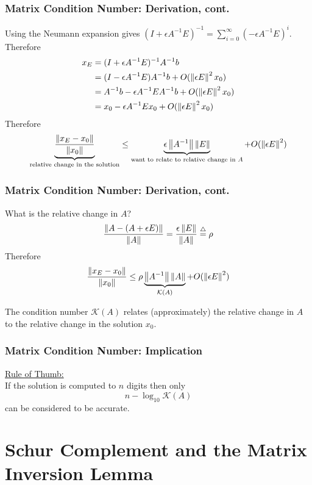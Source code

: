 \documentclass{beamer}
\begin{document}
\begin{frame}\frametitle{Matrix Condition Number: Derivation, cont.}
	Using the Neumann expansion gives
	$(I+\epsilon A^{-1}E)^{-1} = \displaystyle \sum_{i=0}^{\infty} (-\epsilon A^{-1} E)^i$.  Therefore
	\begin{align*}
		x_E &= (I+\epsilon A^{-1}E)^{-1}A^{-1}b \\ 
		&=(I - \epsilon A^{-1} E)A^{-1}b + O(\left\|\epsilon E \right\|^2x_0)\\
		&= A^{-1}b - \epsilon A^{-1}EA^{-1}b + O(\left\|\epsilon E \right\|^2x_0)\\
		&= x_0 - \epsilon A^{-1}Ex_0 + O(\left\|\epsilon E \right\|^2x_0)
	\end{align*}
	Therefore
	\[\underbrace{\displaystyle\frac{\left\|x_E-x_0 \right\|}{\left\|x_0 \right\|}}_{\text{relative change in the solution}} \leq \underbrace{\epsilon\left\|A^{-1} \right\|\left\|E \right\|}_{\text{want to relate to relative change in $A$}}+O(\left\|\epsilon E \right\|^2)  \]
\end{frame}

\begin{frame}\frametitle{Matrix Condition Number: Derivation, cont.}
	What is the relative change in $A$?
	\[\frac{  \left\|A - (A + \epsilon E) \right\|}{  \left\|A \right\|} = \frac{  \epsilon\left\|E \right\|}{  \left\|A \right\|} \stackrel{\triangle}{=} \rho\]
	Therefore
	\[
		\frac{ \left\|x_E - x_0 \right\|}{\left\|x_0 \right\|} \leq \rho \underbrace{\left\|A^{-1}\right\|\left\|A \right\| }_{\mathcal{K}(A)} + O(\left\|\epsilon E \right\|^2) 
	\]
	
	The condition number $\mathcal{K}(A)$ relates (approximately) the relative change in $A$ to the relative change in the solution $x_0$.
\end{frame}

\begin{frame}\frametitle{Matrix Condition Number: Implication}
	\underline{Rule of Thumb:} \\
	If the solution is computed to $n$ digits then only
	\[ n - \log_{10} \mathcal{K}(A) \]
	can be considered to be accurate.
\end{frame}


\section{Schur Complement and the Matrix Inversion Lemma}
\frame{\sectionpage}
\end{document}
